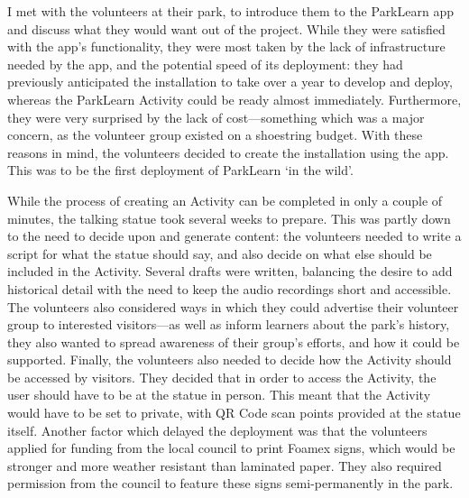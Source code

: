 I met with the volunteers at their park, to introduce them to the ParkLearn app and discuss what they would want out of the project. While they were satisfied with the app's functionality, they were most taken by the lack of infrastructure needed by the app, and the potential speed of its deployment: they had previously anticipated the installation to take over a year to develop and deploy, whereas the ParkLearn Activity could be ready almost immediately. Furthermore, they were very surprised by the lack of cost---something which was a major concern, as the volunteer group existed on a shoestring budget. With these reasons in mind, the volunteers decided to create the installation using the app. This was to be the first deployment of ParkLearn `in the wild'.

While the process of creating an Activity can be completed in only a couple of minutes, the talking statue took several weeks to prepare. This was partly down to the need to decide upon and generate content: the volunteers needed to write a script for what the statue should say, and also decide on what else should be included in the Activity. Several drafts were written, balancing the desire to add historical detail with the need to keep the audio recordings short and accessible. The volunteers also considered ways in which they could advertise their volunteer group to interested visitors---as well as inform learners about the park's history, they also wanted to spread awareness of their group's efforts, and how it could be supported. Finally, the volunteers also needed to decide how the Activity should be accessed by visitors. They decided that in order to access the Activity, the user should have to be at the statue in person. This meant that the Activity would have to be set to private, with QR Code scan points provided at the statue itself. Another factor which delayed the deployment was that the volunteers applied for funding from the local council to print Foamex signs, which would be stronger and more weather resistant than laminated paper. They also required permission from the council to feature these signs semi-permanently in the park.

